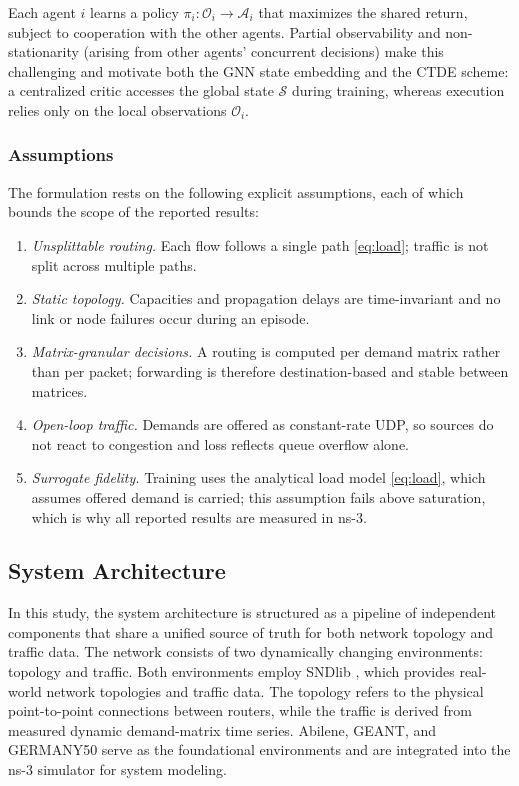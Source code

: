 Each agent $i$ learns a policy $\pi_i:\mathcal{O}_i\to\mathcal{A}_i$ that
maximizes the shared return, subject to cooperation with the other agents.
Partial observability and non-stationarity (arising from other agents'
concurrent decisions) make this challenging and motivate both the GNN state
embedding and the CTDE scheme: a centralized critic accesses the global state
$\mathcal{S}$ during training, whereas execution relies only on the local
observations $\mathcal{O}_i$.

\subsubsection{Assumptions}
The formulation rests on the following explicit assumptions, each of which
bounds the scope of the reported results:
\begin{enumerate}
\item \emph{Unsplittable routing.} Each flow follows a single path
\eqref{eq:load}; traffic is not split across multiple paths.
\item \emph{Static topology.} Capacities and propagation delays are
time-invariant and no link or node failures occur during an episode.
\item \emph{Matrix-granular decisions.} A routing is computed per demand
matrix rather than per packet; forwarding is therefore destination-based and
stable between matrices.
\item \emph{Open-loop traffic.} Demands are offered as constant-rate UDP, so
sources do not react to congestion and loss reflects queue overflow alone.
\item \emph{Surrogate fidelity.} Training uses the analytical load model
\eqref{eq:load}, which assumes offered demand is carried; this assumption fails
above saturation, which is why all reported results are measured in ns-3.
\end{enumerate}

\subsection{System Architecture}
In this study, the system architecture is structured as a pipeline of independent components that share a unified source of truth for both network topology and traffic data. The network consists of two dynamically changing environments: topology and traffic. Both environments employ SNDlib \cite{SNDlib10} \cite{OrlowskiPioroTomaszewskiWessaely2010}, which provides real-world network topologies and traffic data. The topology refers to the physical point-to-point connections between routers, while the traffic is derived from measured dynamic demand-matrix time series. Abilene, GEANT, and GERMANY50 serve as the foundational environments and are integrated into the ns-3 simulator for system modeling.

